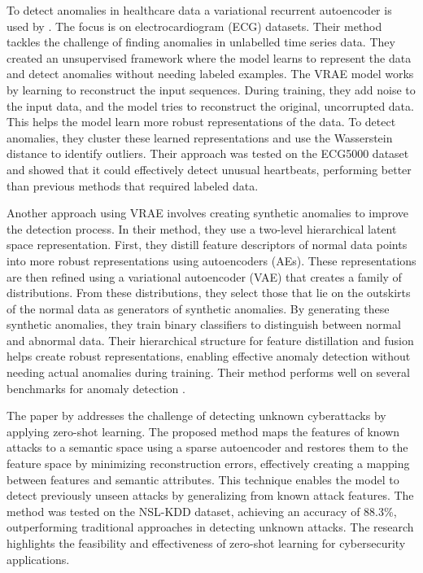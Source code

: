%
To detect anomalies in healthcare data a variational recurrent autoencoder is used by . %
The focus is on electrocardiogram (ECG) datasets. Their method tackles the challenge of finding anomalies in unlabelled time series data. They created an unsupervised framework where the model learns to represent the data and detect anomalies without needing labeled examples.
The VRAE model works by learning to reconstruct the input sequences. During training, they add noise to the input data, and the model tries to reconstruct the original, uncorrupted data. This helps the model learn more robust representations of the data. To detect anomalies, they cluster these learned representations and use the Wasserstein distance to identify outliers. Their approach was tested on the ECG5000 dataset and showed that it could effectively detect unusual heartbeats, performing better than previous methods that required labeled data.

%
Another approach using VRAE involves creating synthetic anomalies to improve the detection process. In their method, they use a two-level hierarchical latent space representation. First, they distill feature descriptors of normal data points into more robust representations using autoencoders (AEs). These representations are then refined using a variational autoencoder (VAE) that creates a family of distributions. From these distributions, they select those that lie on the outskirts of the normal data as generators of synthetic anomalies.
By generating these synthetic anomalies, they train binary classifiers to distinguish between normal and abnormal data. Their hierarchical structure for feature distillation and fusion helps create robust representations, enabling effective anomaly detection without needing actual anomalies during training. Their method performs well on several benchmarks for anomaly detection  .

The paper by  addresses the challenge of detecting unknown cyberattacks by applying zero-shot learning. The proposed method maps the features of known attacks to a semantic space using a sparse autoencoder and restores them to the feature space by minimizing reconstruction errors, effectively creating a mapping between features and semantic attributes. This technique enables the model to detect previously unseen attacks by generalizing from known attack features. The method was tested on the NSL-KDD dataset, achieving an accuracy of 88.3\%, outperforming traditional approaches in detecting unknown attacks. The research highlights the feasibility and effectiveness of zero-shot learning for cybersecurity applications.

